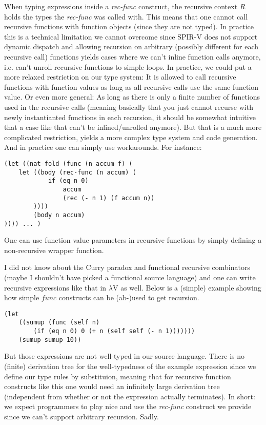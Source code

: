\documentclass[letterpaper,12pt]{article}
\begin{document}
When typing expressions inside a \textit{rec-func} construct, the recursive 
context $R$ holds the types the \textit{rec-func} was called with. This means
that one cannot call recursive functions with function objects (since they
are not typed). In practice
this is a technical limitation we cannot overcome since SPIR-V does not support
dynamic dispatch and allowing recursion on arbitrary (possibly different
for each recursive call) functions yields cases where we can't inline
function calls anymore, i.e. can't unroll recursive functions to simple loops.
In practice, we could put a more relaxed restriction on our type system:
It is allowed to call recursive functions with function values as long
as all recursive calls use the same function value. Or even more general:
As long as there is only a finite number of functions used in the
recursive calls (meaning basically that you just cannot recurse with newly
instantianted functions in each recursion, it should be somewhat intuitive
that a case like that can't be inlined/unrolled anymore). But that
is a much more complicated restriction, yields a more complex type system
and code generation. And in practice one can simply use workarounds.
For instance:

\begin{lstlisting}
(let ((nat-fold (func (n accum f) (
	let ((body (rec-func (n accum) (
			if (eq n 0)
				accum
				(rec (- n 1) (f accum n))
		))))
		(body n accum)
)))) ... )
\end{lstlisting}

One can use function value parameters in recursive functions
by simply defining a non-recursive wrapper function.

I did not know about the Curry paradox and functional
recursive combinators (maybe I shouldn't have picked a functional source language)
and one can write recursive expressions like that in $\lambda$V as well.
Below is a (simple) example showing how simple $func$ constructs can
be (ab-)used to get recursion.

\begin{lstlisting}
(let 
	((sumup (func (self n) 
		(if (eq n 0) 0 (+ n (self self (- n 1)))))))
	(sumup sumup 10))
\end{lstlisting}

But those expressions are not well-typed in our source language.
There is no (finite) derivation tree
for the well-typedness of the example expression since we define our
type rules by substituion, meaning that for recursive function constructs
like this one would need an infinitely large derivation tree (independent
from whether or not the expression actually terminates).
In short: we expect programmers to play nice and use the \textit{rec-func}
construct we provide since we can't support arbitrary recursion. Sadly.
\end{document}
